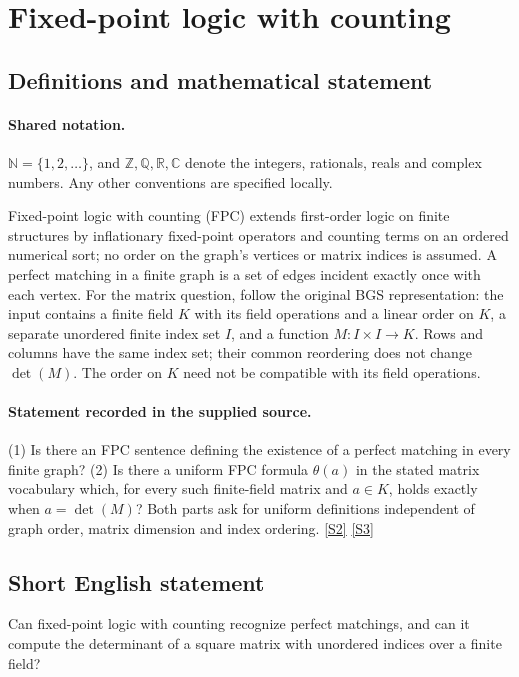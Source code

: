 \documentclass[11pt]{article}
\newcommand{\sref}[2]{\hyperlink{source:#1:#2}{[S#2]}}
\begin{document}
\section{Fixed-point logic with counting}\label{statement}

\subsection{Definitions and mathematical statement}

\paragraph{Shared notation.}$\mathbb N=\{1,2,\ldots\}$, and $\mathbb Z,\mathbb Q,\mathbb R,\mathbb C$ denote the integers, rationals, reals and complex numbers. Any other conventions are specified locally.


Fixed-point logic with counting (FPC) extends first-order logic on finite structures by inflationary fixed-point operators and counting terms on an ordered numerical sort; no order on the graph's vertices or matrix indices is assumed. A perfect matching in a finite graph is a set of edges incident exactly once with each vertex. For the matrix question, follow the original BGS representation: the input contains a finite field $K$ with its field operations and a linear order on $K$, a separate unordered finite index set $I$, and a function $M:I\times I\to K$. Rows and columns have the same index set; their common reordering does not change $\det(M)$. The order on $K$ need not be compatible with its field operations.
\paragraph{Statement recorded in the supplied source.}
(1) Is there an FPC sentence defining the existence of a perfect matching in every finite graph? (2) Is there a uniform FPC formula $\theta(a)$ in the stated matrix vocabulary which, for every such finite-field matrix and $a\in K$, holds exactly when $a=\det(M)$? Both parts ask for uniform definitions independent of graph order, matrix dimension and index ordering. \sref{statement}{2} \sref{statement}{3}
\subsection{Short English statement}
Can fixed-point logic with counting recognize perfect matchings, and can it compute the determinant of a square matrix with unordered indices over a finite field?
\end{document}
